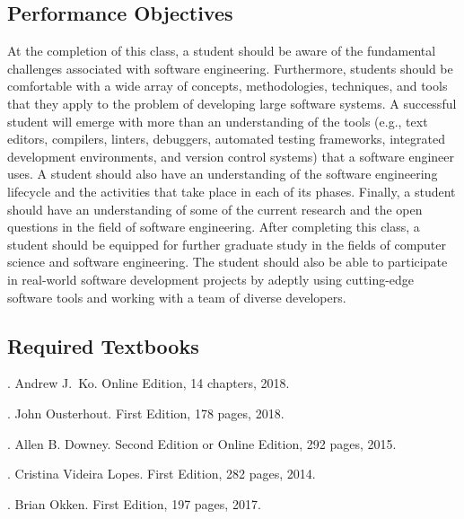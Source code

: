 \documentclass[11pt]{article}
\begin{document}
\vspace*{-.25em}
\subsection*{Performance Objectives}

At the completion of this class, a student should be aware of the fundamental
challenges associated with software engineering. Furthermore, students should
be comfortable with a wide array of concepts, methodologies, techniques, and
tools that they apply to the problem of developing large software systems. A
successful student will emerge with more than an understanding of the tools
(e.g., text editors, compilers, linters, debuggers, automated testing
frameworks, integrated development environments, and version control systems)
that a software engineer uses. A student should also have an understanding of
the software engineering lifecycle and the activities that take place in each
of its phases. Finally, a student should have an understanding of some of the
current research and the open questions in the field of software engineering.
After completing this class, a student should be equipped for further graduate
study in the fields of computer science and software engineering. The student
should also be able to participate in real-world software development projects
by adeptly using cutting-edge software tools and working with a team of diverse
developers.

\vspace*{-.25em}
\subsection*{Required Textbooks}

. Andrew J.\ Ko.
Online Edition, 14 chapters, 2018.
%
\vspace*{.25em}

. John Ousterhout.
First Edition, 178 pages, 2018.
%
\vspace*{.25em}

. Allen B. Downey.
Second Edition or Online Edition, 292 pages, 2015.
%
\vspace*{.25em}

. Cristina Videira Lopes.
First Edition, 282 pages, 2014.
%
\vspace*{.25em}

. Brian Okken.
First Edition, 197 pages, 2017.
%
\vspace*{.5em}
\end{document}
